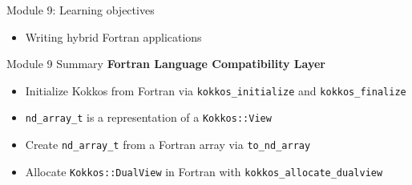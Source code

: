 \begin{frame}
	\titlepage
\end{frame}

\begin{frame}{Module 9: Learning objectives}
  \begin{itemize}
    \item Writing hybrid Fortran applications
  \end{itemize}
\end{frame}



\begin{frame}{Module 9 Summary}
\textbf{Fortran Language Compatibility Layer}
\begin{itemize}
  \item Initialize Kokkos from Fortran via \texttt{kokkos\_initialize} and \texttt{kokkos\_finalize}
  \item \texttt{nd\_array\_t} is a representation of a \texttt{Kokkos::View}
  \item Create \texttt{nd\_array\_t} from a Fortran array via \texttt{to\_nd\_array}
  \item Allocate \texttt{Kokkos::DualView} in Fortran with \texttt{kokkos\_allocate\_dualview}
\end{itemize}
\end{frame}


